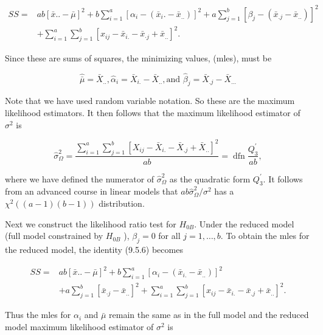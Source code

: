 \begin{align*}
S S= & a b[\bar{x} . .-\bar{\mu}]^{2}+b \sum_{i=1}^{a}\left[\alpha_{i}-\left(\bar{x}_{i} .-\bar{x}_{. .}\right)\right]^{2}+a \sum_{j=1}^{b}\left[\beta_{j}-\left(\bar{x}_{. j}-\bar{x}_{. .}\right)\right]^{2} \\
& +\sum_{i=1}^{a} \sum_{j=1}^{b}\left[x_{i j}-\bar{x}_{i .}-\bar{x}_{\cdot j}+\bar{x}_{. .}\right]^{2} . \tag{9.5.6}
\end{align*}


Since these are sums of squares, the minimizing values, (mles), must be


\begin{equation*}
\hat{\bar{\mu}}=\bar{X}_{. .}, \hat{\alpha}_{i}=\bar{X}_{i .}-\bar{X}_{. .}, \text {and } \hat{\beta}_{j}=\bar{X}_{. j}-\bar{X}_{\ldots} \tag{9.5.7}
\end{equation*}


Note that we have used random variable notation. So these are the maximum likelihood estimators. It then follows that the maximum likelihood estimator of $\sigma^{2}$ is


\begin{equation*}
\hat{\sigma}_{\Omega}^{2}=\frac{\sum_{i=1}^{a} \sum_{j=1}^{b}\left[X_{i j}-\bar{X}_{i .}-\bar{X}_{. j}+\bar{X}_{. .}\right]^{2}}{a b}=\operatorname{dfn} \frac{Q_{3}^{\prime}}{a b}, \tag{9.5.8}
\end{equation*}


where we have defined the numerator of $\hat{\sigma}_{\Omega}^{2}$ as the quadratic form $Q_{3}^{\prime}$. It follows from an advanced course in linear models that $a b \hat{\sigma}_{\Omega}^{2} / \sigma^{2}$ has a $\chi^{2}((a-1)(b-1))$ distribution.

Next we construct the likelihood ratio test for $H_{0 B}$. Under the reduced model (full model constrained by $H_{0 B}$ ), $\beta_{j}=0$ for all $j=1, \ldots, b$. To obtain the mles for the reduced model, the identity (9.5.6) becomes


\begin{align*}
S S= & a b[\bar{x} . .-\bar{\mu}]^{2}+b \sum_{i=1}^{a}\left[\alpha_{i}-\left(\bar{x}_{i .}-\bar{x}_{. .}\right)\right]^{2} \\
& +a \sum_{j=1}^{b}\left[\bar{x}_{\cdot j}-\bar{x}_{. .}\right]^{2}+\sum_{i=1}^{a} \sum_{j=1}^{b}\left[x_{i j}-\bar{x}_{i .}-\bar{x}_{. j}+\bar{x}_{. .}\right]^{2} . \tag{9.5.9}
\end{align*}


Thus the mles for $\alpha_{i}$ and $\bar{\mu}$ remain the same as in the full model and the reduced model maximum likelihood estimator of $\sigma^{2}$ is



